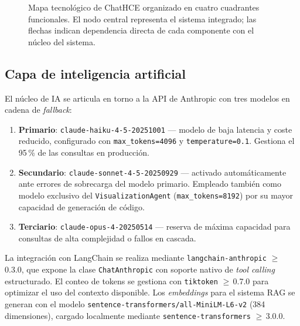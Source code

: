 \begin{figure}[htbp]
\caption{Mapa tecnológico de ChatHCE organizado en cuatro cuadrantes funcionales.
  El nodo central representa el sistema integrado; las flechas indican dependencia
  directa de cada componente con el núcleo del sistema.}
\label{fig:tech_stack}
\end{figure}


\subsection{Capa de inteligencia artificial}
\label{sec:stack_ia}

El núcleo de IA se articula en torno a la API de Anthropic con tres modelos
en cadena de \textit{fallback}:

\begin{enumerate}[nosep, leftmargin=*]
  \item \textbf{Primario}: \texttt{claude-haiku-4-5-20251001} — modelo de baja
    latencia y coste reducido, configurado con \texttt{max\_tokens=4096} y
    \texttt{temperature=0.1}. Gestiona el 95\,\% de las consultas en producción.
  \item \textbf{Secundario}: \texttt{claude-sonnet-4-5-20250929} — activado
    automáticamente ante errores de sobrecarga del modelo primario.
    Empleado también como modelo exclusivo del \texttt{VisualizationAgent}
    (\texttt{max\_tokens=8192}) por su mayor capacidad de generación de código.
  \item \textbf{Terciario}: \texttt{claude-opus-4-20250514} — reserva de máxima
    capacidad para consultas de alta complejidad o fallos en cascada.
\end{enumerate}

La integración con LangChain se realiza mediante \texttt{langchain-anthropic}
$\geq$\,0.3.0, que expone la clase \texttt{ChatAnthropic} con soporte nativo
de \textit{tool calling} estructurado. El conteo de tokens se gestiona con
\texttt{tiktoken} $\geq$\,0.7.0 para optimizar el uso del contexto disponible.
Los \textit{embeddings} para el sistema RAG se generan con el modelo
\texttt{sentence-transformers/all-MiniLM-L6-v2} (384 dimensiones), cargado
localmente mediante \texttt{sentence-transformers} $\geq$\,3.0.0.

